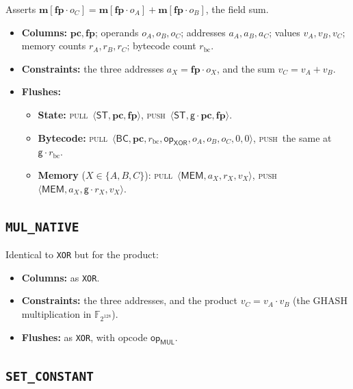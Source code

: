 \documentclass[11pt]{article}
\newcommand{\F}{\mathbb{F}}
\newcommand{\gen}{\mathsf{g}}
\newcommand{\loc}[1]{\mem[\fp\cdot #1]}
\newcommand{\pc}{\mathbf{pc}}
\newcommand{\fp}{\mathbf{fp}}
\newcommand{\mem}{\mathbf{m}}
\newcommand{\push}{\textsc{push}}
\newcommand{\pull}{\textsc{pull}}
\newcommand{\tup}[1]{\langle #1 \rangle}
\newcommand{\dsep}[1]{\mathsf{#1}}
\newcommand{\opc}[1]{\mathsf{op}_{\mathsf{#1}}}
\begin{document}
Asserts $\loc{o_C}=\loc{o_A}+\loc{o_B}$, the field sum.
\begin{itemize}
\item \textbf{Columns:} $\pc,\fp$; operands $o_A,o_B,o_C$; addresses $a_A,a_B,a_C$; values $v_A,v_B,v_C$; memory counts $r_A,r_B,r_C$; bytecode count $r_{\mathrm{bc}}$.
\item \textbf{Constraints:} the three addresses $a_X=\fp\cdot o_X$, and the sum $v_C=v_A+v_B$.
\item \textbf{Flushes:}
  \begin{itemize}
  \item \textbf{State:} \pull\ $\tup{\dsep{ST},\pc,\fp}$, \push\ $\tup{\dsep{ST},\gen\cdot\pc,\fp}$.
  \item \textbf{Bytecode:} \pull\ $\tup{\dsep{BC},\pc,r_{\mathrm{bc}},\opc{XOR},o_A,o_B,o_C,0,0}$, \push\ the same at $\gen\cdot r_{\mathrm{bc}}$.
  \item \textbf{Memory} ($X\in\{A,B,C\}$): \pull\ $\tup{\dsep{MEM},a_X,r_X,v_X}$, \push\ $\tup{\dsep{MEM},a_X,\gen\cdot r_X,v_X}$.
  \end{itemize}
\end{itemize}

\subsection{\texttt{MUL\_NATIVE}}\label{sec:tab-mul}

Identical to \texttt{XOR} but for the product:
\begin{itemize}
\item \textbf{Columns:} as \texttt{XOR}.
\item \textbf{Constraints:} the three addresses, and the product $v_C=v_A\cdot v_B$ (the GHASH multiplication in $\F_{2^{128}}$).
\item \textbf{Flushes:} as \texttt{XOR}, with opcode $\opc{MUL}$.
\end{itemize}

\subsection{\texttt{SET\_CONSTANT}}\label{sec:tab-set}
\end{document}
